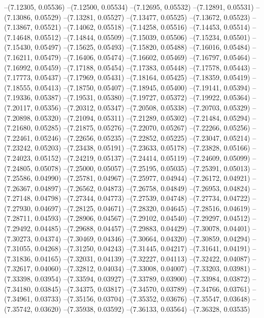 --(7.12305, 0.05536)
--(7.12500, 0.05534)
--(7.12695, 0.05532)
--(7.12891, 0.05531)
--(7.13086, 0.05529)
--(7.13281, 0.05527)
--(7.13477, 0.05525)
--(7.13672, 0.05523)
--(7.13867, 0.05521)
--(7.14062, 0.05518)
--(7.14258, 0.05516)
--(7.14453, 0.05514)
--(7.14648, 0.05512)
--(7.14844, 0.05509)
--(7.15039, 0.05506)
--(7.15234, 0.05501)
--(7.15430, 0.05497)
--(7.15625, 0.05493)
--(7.15820, 0.05488)
--(7.16016, 0.05484)
--(7.16211, 0.05479)
--(7.16406, 0.05474)
--(7.16602, 0.05469)
--(7.16797, 0.05464)
--(7.16992, 0.05459)
--(7.17188, 0.05454)
--(7.17383, 0.05448)
--(7.17578, 0.05443)
--(7.17773, 0.05437)
--(7.17969, 0.05431)
--(7.18164, 0.05425)
--(7.18359, 0.05419)
--(7.18555, 0.05413)
--(7.18750, 0.05407)
--(7.18945, 0.05400)
--(7.19141, 0.05394)
--(7.19336, 0.05387)
--(7.19531, 0.05380)
--(7.19727, 0.05372)
--(7.19922, 0.05364)
--(7.20117, 0.05356)
--(7.20312, 0.05347)
--(7.20508, 0.05338)
--(7.20703, 0.05329)
--(7.20898, 0.05320)
--(7.21094, 0.05311)
--(7.21289, 0.05302)
--(7.21484, 0.05294)
--(7.21680, 0.05285)
--(7.21875, 0.05276)
--(7.22070, 0.05267)
--(7.22266, 0.05256)
--(7.22461, 0.05246)
--(7.22656, 0.05235)
--(7.22852, 0.05225)
--(7.23047, 0.05214)
--(7.23242, 0.05203)
--(7.23438, 0.05191)
--(7.23633, 0.05178)
--(7.23828, 0.05166)
--(7.24023, 0.05152)
--(7.24219, 0.05137)
--(7.24414, 0.05119)
--(7.24609, 0.05099)
--(7.24805, 0.05078)
--(7.25000, 0.05057)
--(7.25195, 0.05035)
--(7.25391, 0.05013)
--(7.25586, 0.04990)
--(7.25781, 0.04967)
--(7.25977, 0.04944)
--(7.26172, 0.04921)
--(7.26367, 0.04897)
--(7.26562, 0.04873)
--(7.26758, 0.04849)
--(7.26953, 0.04824)
--(7.27148, 0.04798)
--(7.27344, 0.04773)
--(7.27539, 0.04748)
--(7.27734, 0.04722)
--(7.27930, 0.04697)
--(7.28125, 0.04671)
--(7.28320, 0.04645)
--(7.28516, 0.04619)
--(7.28711, 0.04593)
--(7.28906, 0.04567)
--(7.29102, 0.04540)
--(7.29297, 0.04512)
--(7.29492, 0.04485)
--(7.29688, 0.04457)
--(7.29883, 0.04429)
--(7.30078, 0.04401)
--(7.30273, 0.04374)
--(7.30469, 0.04346)
--(7.30664, 0.04320)
--(7.30859, 0.04294)
--(7.31055, 0.04268)
--(7.31250, 0.04243)
--(7.31445, 0.04217)
--(7.31641, 0.04191)
--(7.31836, 0.04165)
--(7.32031, 0.04139)
--(7.32227, 0.04113)
--(7.32422, 0.04087)
--(7.32617, 0.04060)
--(7.32812, 0.04034)
--(7.33008, 0.04007)
--(7.33203, 0.03981)
--(7.33398, 0.03954)
--(7.33594, 0.03927)
--(7.33789, 0.03900)
--(7.33984, 0.03872)
--(7.34180, 0.03845)
--(7.34375, 0.03817)
--(7.34570, 0.03789)
--(7.34766, 0.03761)
--(7.34961, 0.03733)
--(7.35156, 0.03704)
--(7.35352, 0.03676)
--(7.35547, 0.03648)
--(7.35742, 0.03620)
--(7.35938, 0.03592)
--(7.36133, 0.03564)
--(7.36328, 0.03535)
